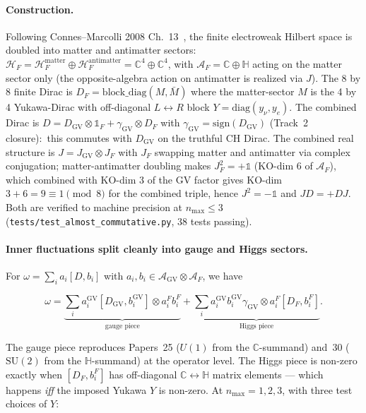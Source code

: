 \documentclass[11pt]{article}
\begin{document}
\paragraph{Construction.}  Following Connes--Marcolli 2008
Ch.~13~\cite{connes_marcolli2008}, the finite electroweak Hilbert
space is doubled into matter and antimatter sectors:\ $\mathcal{H}_F
= \mathcal{H}_F^{\mathrm{matter}} \oplus
\mathcal{H}_F^{\mathrm{antimatter}} = \mathbb{C}^4 \oplus \mathbb{C}^4$,
with $\mathcal{A}_F = \mathbb{C} \oplus \mathbb{H}$ acting on the
matter sector only (the opposite-algebra action on antimatter is
realized via $J$).  The 8 by 8 finite Dirac is $D_F =
\mathrm{block\_diag}(M, \bar{M})$ where the matter-sector $M$ is the
4 by 4 Yukawa-Dirac with off-diagonal $L \leftrightarrow R$ block
$Y = \mathrm{diag}(y_\nu, y_e)$.  The combined Dirac is $D =
D_{\mathrm{GV}} \otimes \mathbb{1}_F + \gamma_{\mathrm{GV}} \otimes
D_F$ with $\gamma_{\mathrm{GV}} = \mathrm{sign}(D_{\mathrm{GV}})$
(Track~2 closure):\ this commutes with $D_{\mathrm{GV}}$ on the
truthful CH Dirac.  The combined real structure is $J = J_{\mathrm{GV}}
\otimes J_F$ with $J_F$ swapping matter and antimatter via complex
conjugation; matter-antimatter doubling makes $J_F^2 = +\mathbb{1}$
(KO-dim 6 of $\mathcal{A}_F$), which combined with KO-dim 3 of the
GV factor gives KO-dim $3 + 6 = 9 \equiv 1 \pmod 8$ for the
combined triple, hence $J^2 = -\mathbb{1}$ and $J D = +D J$.  Both
are verified to machine precision at $n_{\max} \le 3$
(\texttt{tests/test\_almost\_commutative.py}, 38 tests passing).

\paragraph{Inner fluctuations split cleanly into gauge and Higgs
sectors.}  For $\omega = \sum_i a_i [D, b_i]$ with $a_i, b_i \in
\mathcal{A}_{\mathrm{GV}} \otimes \mathcal{A}_F$, we have

\begin{equation}
\label{eq:omega_decomp}
\omega = \underbrace{\sum_i a_i^{\mathrm{GV}} [D_{\mathrm{GV}},
b_i^{\mathrm{GV}}] \otimes a_i^F b_i^F}_{\text{gauge piece}} +
\underbrace{\sum_i a_i^{\mathrm{GV}} b_i^{\mathrm{GV}}
\gamma_{\mathrm{GV}} \otimes a_i^F [D_F, b_i^F]}_{\text{Higgs
piece}}.
\end{equation}

The gauge piece reproduces Papers~25 ($U(1)$ from the
$\mathbb{C}$-summand) and~30 ($\mathrm{SU}(2)$ from the
$\mathbb{H}$-summand) at the operator level.  The Higgs piece is
non-zero exactly when $[D_F, b_i^F]$ has off-diagonal $\mathbb{C}
\leftrightarrow \mathbb{H}$ matrix elements --- which happens
\emph{iff} the imposed Yukawa $Y$ is non-zero.  At
$n_{\max} = 1, 2, 3$, with three test choices of $Y$:
\end{document}
